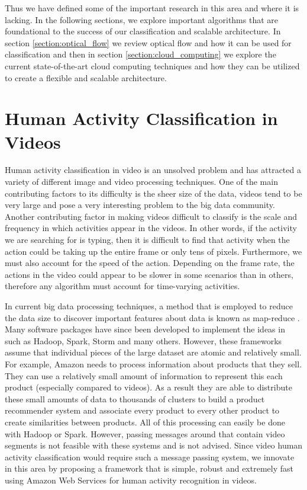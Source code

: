 \FloatBarrier

Thus we have defined some of the important research in this area and where it is
lacking. In the following sections, we explore important algorithms that are
foundational to the success of our classification and scalable architecture. In
section \ref{section:optical_flow} we review optical flow and how it can be used
for classification and then in section \ref{section:cloud_computing} we explore
the current state-of-the-art cloud computing techniques and how they can be
utilized to create a flexible and scalable architecture.

\section{\label{section:activity_classification}Human Activity Classification in Videos}
Human activity classification in video is an unsolved problem and has attracted
a variety of different image and video processing techniques. One of the main
contributing factors to its difficulty is the sheer size of the data, videos
tend to be very large and pose a very interesting problem to the big data
community. Another contributing factor in making videos difficult to classify is
the scale and frequency in which activities appear in the videos. In other
words, if the activity we are searching for is typing, then it is difficult to
find that activity when the action could be taking up the entire frame or only
tens of pixels. Furthermore, we must also account for the speed of the action.
Depending on the frame rate, the actions in the video could appear to be slower
in some scenarios than in others, therefore any algorithm must account for
time-varying activities.

In current big data processing techniques, a method that is employed to reduce
the data size to discover important features about data is known as map-reduce
\cite{dean2008mapreduce}. Many software packages have since been developed to
implement the ideas in \cite{dean2008mapreduce} such as Hadoop, Spark, Storm
and many others. However, these frameworks assume that individual pieces of the
large dataset are atomic and relatively small. For example, Amazon needs to process
information about products that they sell. They can use a relatively small amount
of information to represent this each product (especially compared to videos).
As a result they are able to distribute these small amounts of data to thousands
of clusters to build a product recommender system and associate every product to
every other product to create similarities between products. All of this processing
can easily be done with Hadoop\cite{White:2009:HDG:1717298} or Spark. However,
passing messages around that contain video segments is not feasible with these
systems and is not advised. Since video human activity classification would
require such a message passing system, we innovate in this area by proposing a
framework that is simple, robust and extremely fast using Amazon Web Services
for human activity recognition in videos.

